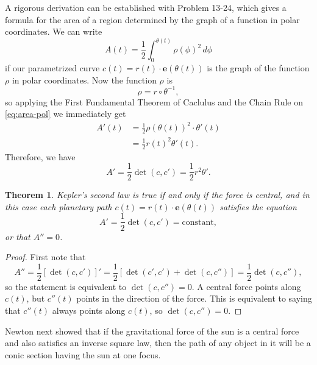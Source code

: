 \documentclass{article}
\newtheorem{theorem}{Theorem}
\begin{document}
A rigorous derivation can be established with Problem 13-24, which gives a
formula for the area of a region determined by the graph of a function in polar
coordinates. We can write
\begin{equation} \label{eq:area-pol} \tag{*}
  A(t) = \frac{1}{2} \int_0^{\theta(t)} \rho(\phi)^2 \,d\phi
\end{equation}
if our parametrized curve $c(t) = r(t) \cdot \mathbf{e}(\theta(t))$ is the
graph of the function $\rho$ in polar coordinates. Now the function $\rho$ is
\[
  \rho = r \circ \theta^{-1},
\] so applying the First Fundamental Theorem of Caclulus and the Chain Rule on
\eqref{eq:area-pol} we immediately get
\begin{align*}
  A'(t) &= \frac{1}{2}\rho(\theta(t))^2 \cdot \theta'(t) \\
        &= \frac{1}{2} r(t)^2 \theta'(t).
\end{align*} Therefore, we have
\begin{equation} \label{eq:A'}
  \boxed{
    A' = \frac{1}{2}\det(c, c') = \frac{1}{2}r^2\theta'.
  }
\end{equation}

\begin{theorem}
  Kepler's second law is true if and only if the force is central, and in this
  case each planetary path $c(t) = r(t) \cdot \mathbf{e}(\theta(t))$ satisfies
  the equation
  \begin{equation} \label{eq:kep2} \tag{$K_2$}
    A' = \frac{1}{2}\det(c, c') = \text{constant},
  \end{equation} or that $A'' = 0$.
\end{theorem}
\begin{proof}
  First note that \[
    A'' = \frac{1}{2}[\det(c, c')]' = \frac{1}{2}[\det(c', c') + \det(c, c'')]
    = \frac{1}{2}\det(c, c''),
  \] so the statement is equivalent to $\det(c, c'') = 0$. A central force
  points along $c(t)$, but $c''(t)$ points in the direction of the force. This
  is equivalent to saying that $c''(t)$ always points along $c(t)$, so
  $\det(c, c'') = 0$.
\end{proof}

Newton next showed that if the gravitational force of the sun is a central
force and also satisfies an inverse square law, then the path of any object in
it will be a conic section having the sun at one focus.
\end{document}
